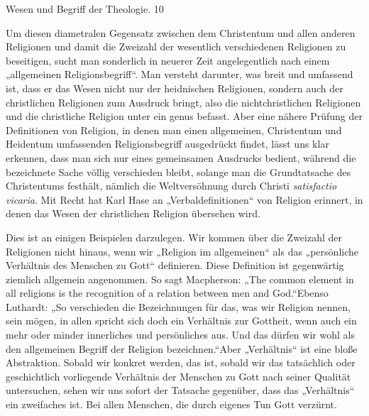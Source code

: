 \noindent Wesen und Begriff der Theologie. \hfill 10

Um diesen diametralen Gegensatz zwischen dem Christentum und allen anderen Religionen und damit die Zweizahl der wesentlich verschiedenen Religionen zu beseitigen, sucht man sonderlich in neuerer Zeit angelegentlich nach einem „allgemeinen Religionsbegriff“. Man versteht darunter, was breit und umfassend ist, dass er das Wesen nicht nur der heidnischen Religionen, sondern auch der christlichen Religionen zum Ausdruck bringt, also die nichtchristlichen Religionen und die christliche Religion unter ein genus befasst. Aber eine nähere Prüfung der Definitionen von Religion, in denen man einen allgemeinen, Christentum und Heidentum umfassenden Religionsbegriff ausgedrückt findet, lässt uns klar erkennen, dass man sich nur eines gemeinsamen Ausdrucks bedient, während die bezeichnete Sache völlig verschieden bleibt, solange man die Grundtatsache des Christentums festhält, nämlich die Weltversöhnung durch Christi \emph{satisfactio vicaria}. Mit Recht hat Karl Hase an „Verbaldefinitionen“ von Religion erinnert, in denen das Wesen der christlichen Religion übersehen wird.\footnotemark[23]

Dies ist an einigen Beispielen darzulegen. Wir kommen über die Zweizahl der Religionen nicht hinaus, wenn wir „Religion im allgemeinen“ als das „persönliche Verhältnis des Menschen zu Gott“ definieren. Diese Definition ist gegenwärtig ziemlich allgemein angenommen. So sagt Macpherson: „The common element in all religions is the recognition of a relation between men and God.“\footnotemark[24] Ebenso Luthardt: „So verschieden die Bezeichnungen für das, was wir Religion nennen, sein mögen, in allen spricht sich doch ein Verhältnis zur Gottheit, wenn auch ein mehr oder minder innerliches und persönliches aus. Und das dürfen wir wohl als den allgemeinen Begriff der Religion bezeichnen.“\footnotemark[25] Aber „Verhältnis“ ist eine bloße Abstraktion. Sobald wir konkret werden, das ist, sobald wir das tatsächlich oder geschichtlich vorliegende Verhältnis der Menschen zu Gott nach seiner Qualität untersuchen, sehen wir uns sofort der Tatsache gegenüber, dass das „Verhältnis“ ein zweifaches ist. Bei allen Menschen, die durch eigenes Tun Gott verzürnt.

